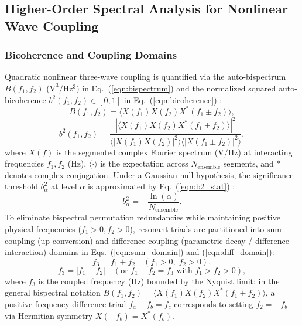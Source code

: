\subsection{Higher-Order Spectral Analysis for Nonlinear Wave Coupling}

\subsubsection{Bicoherence and Coupling Domains}
Quadratic nonlinear three-wave coupling is quantified via the auto-bispectrum $B(f_1, f_2)$ ($\mathrm{V^3/Hz^3}$) in Eq.~(\ref{eqn:bispectrum}) and the normalized squared auto-bicoherence $b^2(f_1, f_2) \in [0, 1]$ in Eq.~(\ref{eqn:bicoherence}) \cite{proakis2021digital, Hou2019, Fujisawa2021}:
\begin{equation}
\label{eqn:bispectrum}
B(f_1, f_2) = \langle X(f_1) X(f_2) X^*(f_1 \pm f_2) \rangle,
\end{equation}
\begin{equation}
\label{eqn:bicoherence}
b^2(f_1, f_2) = \frac{|\langle X(f_1) X(f_2) X^*(f_1 \pm f_2) \rangle|^2}{\langle |X(f_1) X(f_2)|^2 \rangle \langle |X(f_1 \pm f_2)|^2 \rangle},
\end{equation}
\noindent where $X(f)$ is the segmented complex Fourier spectrum ($\mathrm{V/Hz}$) at interacting frequencies $f_1, f_2$ ($\mathrm{Hz}$), $\langle \cdot \rangle$ is the expectation across $N_{\mathrm{ensemble}}$ segments, and $*$ denotes complex conjugation. Under a Gaussian null hypothesis, the significance threshold $b^2_\alpha$ at level $\alpha$ is approximated by Eq.~(\ref{eqn:b2_stat}) \cite{Hou2019, Fujisawa2021, HinichWolinsky2005}:
\begin{equation}
\label{eqn:b2_stat}
b^2_\alpha = -\frac{\ln(\alpha)}{N_{\mathrm{ensemble}}}.
\end{equation}
To eliminate bispectral permutation redundancies while maintaining positive physical frequencies ($f_1 > 0, f_2 > 0$), resonant triads are partitioned into sum-coupling (up-conversion) and difference-coupling (parametric decay / difference interaction) domains in Eqs.~(\ref{eqn:sum_domain}) and (\ref{eqn:diff_domain}):
\begin{equation}
\label{eqn:sum_domain}
f_3 = f_1 + f_2 \quad (f_1 > 0,\; f_2 > 0),
\end{equation}
\begin{equation}
\label{eqn:diff_domain}
f_3 = |f_1 - f_2| \quad (\text{or } f_1 - f_2 = f_3 \text{ with } f_1 > f_2 > 0),
\end{equation}
\noindent where $f_3$ is the coupled frequency ($\mathrm{Hz}$) bounded by the Nyquist limit; in the general bispectral notation $B(f_1, f_2) = \langle X(f_1) X(f_2) X^*(f_1 + f_2) \rangle$, a positive-frequency difference triad $f_a - f_b = f_c$ corresponds to setting $f_2 = -f_b$ via Hermitian symmetry $X(-f_b) = X^*(f_b)$.

